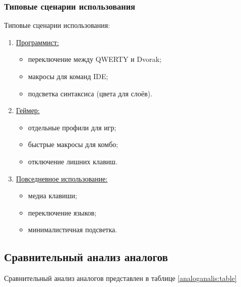 \subsubsection{Типовые сценарии использования}

Типовые сценарии использования:

\begin{enumerate}
\item \underline{Программист:}

\begin{itemize}
\item переключение между QWERTY и Dvorak;
\item макросы для команд IDE;
\item подсветка синтаксиса (цвета для слоёв).
\end{itemize}

\item \underline{Геймер:}

\begin{itemize}
\item отдельные профили для игр;
\item быстрые макросы для комбо;
\item отключение лишних клавиш.
\end{itemize}

\item \underline{Повседневное использование:}

\begin{itemize}
\item медиа клавиши;
\item переключение языков;
\item минималистичная подсветка.
\end{itemize}
\end{enumerate}

\subsection{Сравнительный анализ аналогов}

Сравнительный анализ аналогов представлен в таблице \ref{analoganalis:table}

